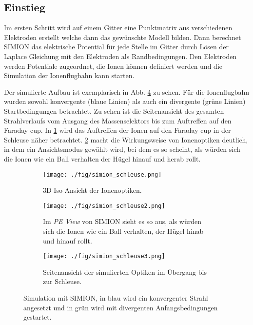 \subsection{Einstieg}
Im ersten Schritt wird auf einem Gitter eine Punktmatrix aus verschiedenen Elektroden erstellt welche dann das gewünschte Modell bilden.
Dann berechnet SIMION das elektrische Potential für jede Stelle im Gitter durch Lösen der Laplace Gleichung mit den Elektroden als Randbedingungen.
Den Elektroden werden Potentiale zugeordnet, die Ionen können definiert werden und die Simulation der Ionenflugbahn kann starten.

Der simulierte Aufbau ist exemplarisch in Abb. \ref{fig:simion_schleuse} zu sehen. 
Für die Ionenflugbahn wurden sowohl konvergente (blaue Linien) als auch ein divergente (grüne Linien) Startbedingungen betrachtet.
Zu sehen ist die Seitenansicht des gesamten Strahlverlaufs vom Ausgang des Massenselektors bis zum Auftreffen auf den Faraday cup.
In \ref{fig:0} wird das Auftreffen der Ionen auf den Faraday cup in der Schleuse näher betrachtet.
\ref{fig:1} macht die Wirkungsweise von Ionenoptiken deutlich, in dem ein Ansichtsmodus gewählt wird, bei dem es so scheint, als würden sich die Ionen wie ein Ball verhalten der Hügel hinauf und herab rollt.


\begin{figure}
  \centering
  \begin{subfigure}[h]{0.45\textwidth}
    \texttt{[image: ./fig/simion\_schleuse.png]}
    \caption{3D Iso Ansicht der Ionenoptiken.}
    \label{fig:0}
  \end{subfigure}\hfill
  \begin{subfigure}[h]{0.5\textwidth}
    \texttt{[image: ./fig/simion\_schleuse2.png]}
    \caption{Im \textit{PE View} von SIMION sieht es so aus, als würden sich die Ionen wie ein Ball verhalten, der Hügel hinab und hinauf rollt.}
    \label{fig:1}
  \end{subfigure}\hfill
  \begin{subfigure}[b]{1\textwidth}
    \texttt{[image: ./fig/simion\_schleuse3.png]}
    \caption{Seitenansicht der simulierten Optiken im Übergang bis zur Schleuse.}
    \label{fig:2}
  \end{subfigure}
  \caption{Simulation mit SIMION, in blau wird ein konvergenter Strahl angesetzt und in grün wird mit divergenten Anfangsbedingungen gestartet.}
  \label{fig:simion_schleuse}
\end{figure}



